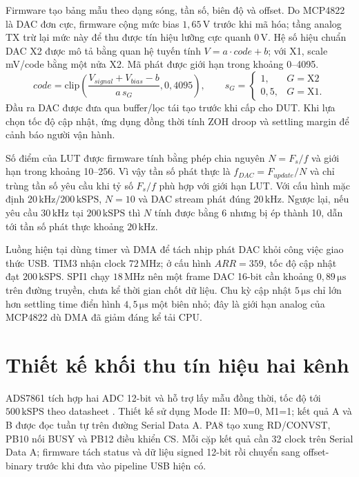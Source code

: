 \documentclass[12pt,a4paper]{report}
\newcommand{\unit}[1]{\,\mathrm{#1}}
\begin{document}
Firmware tạo bảng mẫu theo dạng sóng, tần số, biên độ và offset. Do MCP4822 là DAC đơn cực, firmware cộng mức bias $1{,}65\unit{V}$ trước khi mã hóa; tầng analog TX trừ lại mức này để thu được tín hiệu lưỡng cực quanh $0\unit{V}$. Hệ số hiệu chuẩn DAC X2 được mô tả bằng quan hệ tuyến tính $V=a\cdot code+b$; với X1, scale mV/code bằng một nửa X2. Mã phát được giới hạn trong khoảng 0--4095.
\begin{equation}
code=\mathrm{clip}\left(\frac{V_{signal}+V_{bias}-b}{a\,s_G},0,4095\right),
\qquad s_G=\begin{cases}1,&G=\mathrm{X2}\\0{,}5,&G=\mathrm{X1}.\end{cases}
\end{equation}
Đầu ra DAC được đưa qua buffer/lọc tái tạo trước khi cấp cho DUT. Khi lựa chọn tốc độ cập nhật, ứng dụng đồng thời tính ZOH droop và settling margin để cảnh báo người vận hành.

Số điểm của LUT được firmware tính bằng phép chia nguyên $N=F_s/f$ và giới hạn trong khoảng 10--256. Vì vậy tần số phát thực là $f_{DAC}=F_{update}/N$ và chỉ trùng tần số yêu cầu khi tỷ số $F_s/f$ phù hợp với giới hạn LUT. Với cấu hình mặc định $20\unit{kHz}/200\unit{kSPS}$, $N=10$ và DAC stream phát đúng $20\unit{kHz}$. Ngược lại, nếu yêu cầu $30\unit{kHz}$ tại $200\unit{kSPS}$ thì $N$ tính được bằng 6 nhưng bị ép thành 10, dẫn tới tần số phát thực khoảng $20\unit{kHz}$.

Luồng hiện tại dùng timer và DMA để tách nhịp phát DAC khỏi công việc giao thức USB. TIM3 nhận clock $72\unit{MHz}$; ở cấu hình $ARR=359$, tốc độ cập nhật đạt $200\unit{kSPS}$. SPI1 chạy $18\unit{MHz}$ nên một frame DAC 16-bit cần khoảng $0{,}89\unit{\mu s}$ trên đường truyền, chưa kể thời gian chốt dữ liệu. Chu kỳ cập nhật $5\unit{\mu s}$ chỉ lớn hơn settling time điển hình $4{,}5\unit{\mu s}$ một biên nhỏ; đây là giới hạn analog của MCP4822 dù DMA đã giảm đáng kể tải CPU.

\section{Thiết kế khối thu tín hiệu hai kênh}
ADS7861 tích hợp hai ADC 12-bit và hỗ trợ lấy mẫu đồng thời, tốc độ tới $500\unit{kSPS}$ theo datasheet \cite{ads7861}. Thiết kế sử dụng Mode II: M0=0, M1=1; kết quả A và B được đọc tuần tự trên đường Serial Data A. PA8 tạo xung RD/CONVST, PB10 nối BUSY và PB12 điều khiển CS. Mỗi cặp kết quả cần 32 clock trên Serial Data A; firmware tách status và dữ liệu signed 12-bit rồi chuyển sang offset-binary trước khi đưa vào pipeline USB hiện có.
\end{document}

